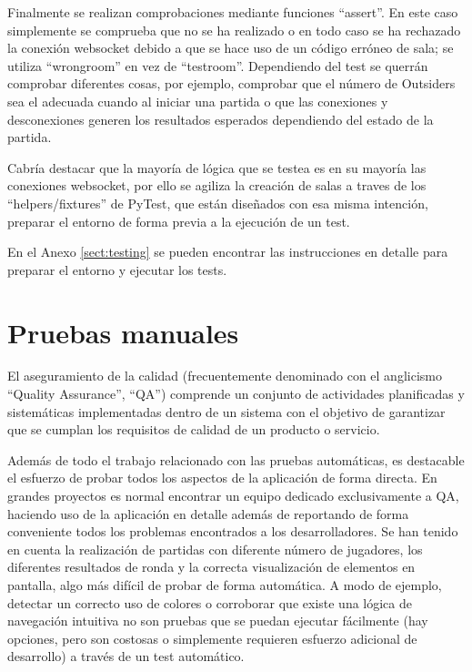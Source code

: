 Finalmente se realizan comprobaciones mediante funciones ``assert''. En este caso simplemente se comprueba que no se ha realizado
o en todo caso se ha rechazado la conexión websocket debido a que se hace uso de un código erróneo de sala; se utiliza ``wrong\textunderscore room''
en vez de ``test\textunderscore room''. Dependiendo del test se querrán comprobar diferentes cosas, por ejemplo, comprobar que el número de Outsiders sea
el adecuada cuando al iniciar una partida o que las conexiones y desconexiones generen los resultados esperados dependiendo del estado de la partida.

Cabría destacar que la mayoría de lógica que se testea es en su mayoría las conexiones websocket, por ello se agiliza la creación de salas
a traves de los ``helpers/fixtures'' de PyTest, que están diseñados con esa misma intención, preparar el entorno de forma previa a la ejecución de 
un test. 

En el Anexo \ref{sect:testing} se pueden encontrar las instrucciones en detalle para preparar el entorno y ejecutar los tests.



\section{Pruebas manuales}

El aseguramiento de la calidad (frecuentemente denominado con el anglicismo ``Quality Assurance'', ``QA'') comprende un conjunto de actividades planificadas 
y sistemáticas implementadas dentro de un sistema con el objetivo de garantizar que se cumplan los requisitos de calidad 
de un producto o servicio.

Además de todo el trabajo relacionado con las pruebas automáticas, es destacable el esfuerzo de probar todos los aspectos de la aplicación
de forma directa. En grandes proyectos es normal encontrar un equipo dedicado exclusivamente a QA, haciendo uso de la aplicación en detalle
además de reportando de forma conveniente todos los problemas encontrados a los desarrolladores. Se han tenido en cuenta la realización de partidas
con diferente número de jugadores, los diferentes resultados de ronda y la correcta visualización de elementos en pantalla, algo más difícil de 
probar de forma automática. A modo de ejemplo, detectar un correcto uso de colores o corroborar que existe una lógica de navegación intuitiva no son pruebas 
que se puedan ejecutar fácilmente (hay opciones, pero son costosas o simplemente requieren esfuerzo adicional de desarrollo) a través de un test automático.

